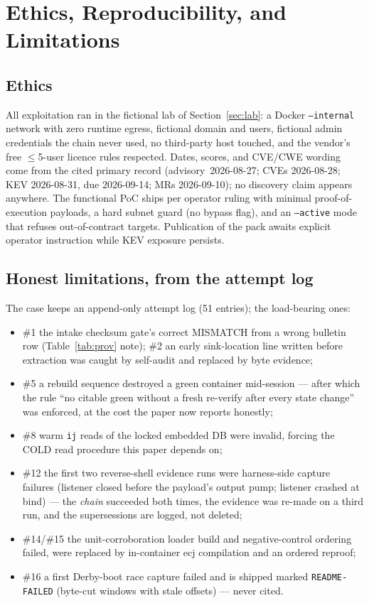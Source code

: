 \documentclass[journal]{IEEEtran}
\begin{document}
\section{Ethics, Reproducibility, and Limitations}
\label{sec:ethics}

\subsection{Ethics}
All exploitation ran in the fictional lab of Section~\ref{sec:lab}: a Docker
\texttt{--internal} network with zero runtime egress, fictional domain and
users, fictional admin credentials the chain never used, no third-party host
touched, and the vendor's free $\leq$5-user licence rules respected. Dates,
scores, and CVE/CWE wording come from the cited primary record
(advisory~2026-08-27; CVEs 2026-08-28; KEV 2026-08-31, due 2026-09-14; MRs
2026-09-10); no discovery claim appears anywhere. The functional PoC ships
per operator ruling with minimal proof-of-execution payloads, a hard subnet guard (no bypass
flag), and an \texttt{--active} mode that refuses out-of-contract targets.
Publication of the pack awaits explicit operator instruction while KEV
exposure persists.

\subsection{Honest limitations, from the attempt log}
The case keeps an append-only attempt log (51 entries); the load-bearing ones:
\begin{itemize}
\item \#1 the intake checksum gate's correct MISMATCH from a wrong bulletin row
(Table~\ref{tab:prov} note); \#2 an early sink-location line written before
extraction was caught by self-audit and replaced by byte evidence;
\item \#5 a rebuild sequence destroyed a green container mid-session — after
which the rule ``no citable green without a fresh re-verify after every state
change'' was enforced, at the cost the paper now reports honestly;
\item \#8 warm \texttt{ij} reads of the locked embedded DB were invalid, forcing
the COLD read procedure this paper depends on;
\item \#12 the first two reverse-shell evidence runs were harness-side capture
failures (listener closed before the payload's output pump; listener crashed at
bind) — the \emph{chain} succeeded both times, the evidence was re-made on a
third run, and the supersessions are logged, not deleted;
\item \#14/\#15 the unit-corroboration loader build and negative-control ordering
failed, were replaced by in-container ecj compilation and an ordered reproof;
\item \#16 a first Derby-boot race capture failed and is shipped marked
\texttt{README-FAILED} (byte-cut windows with stale offsets) — never cited.
\end{itemize}
\end{document}
